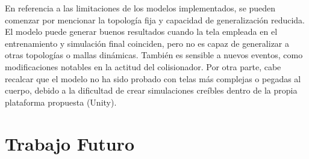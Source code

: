 En referencia a las limitaciones de los modelos implementados, se pueden comenzar por mencionar la topología fija y capacidad de generalización reducida. El modelo puede generar buenos resultados cuando la tela empleada en el entrenamiento y simulación final coinciden, pero no es capaz de generalizar a otras topologías o mallas dinámicas. También es sensible a nuevos eventos, como modificaciones notables en la actitud del colisionador. Por otra parte, cabe recalcar que el modelo no ha sido probado con telas más complejas o pegadas al cuerpo, debido a la dificultad de crear simulaciones creíbles dentro de la propia plataforma propuesta (Unity). 


\section{Trabajo Futuro}

